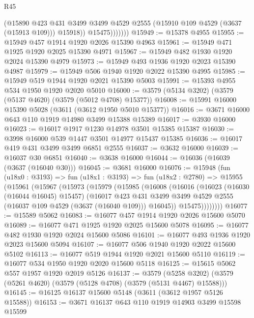 \begin{lexlean}{R45}
\begin{coremodule}
                    (@15890
                      @423
                      @431
                      @3499
                      @3499
                      @4529
                      @2555
                      (@15910 @109 @4529 (@3637 (@15913 @109)))
                      @15918))
                  @15475)))))))
@15949 := @15378 @4955
@15955 := @15949 @457 @1914 @1920 @2026 @15390 @4963
@15961 := @15949 @471 @1925 @1920 @2025 @15390 @4971
@15967 := @15949 @482 @1930 @1920 @2024 @15390 @4979
@15973 := @15949 @493 @1936 @1920 @2023 @15390 @4987
@15979 := @15949 @506 @1940 @1920 @2022 @15390 @4995
@15985 := @15949 @519 @1944 @1920 @2021 @15390 @5003
@15991 := @15393 @4955 @534 @1950 @1920 @2020 @5010
@16000 := @3579 (@5134 @3202) (@3579 (@5137 @4620) (@3579 (@5012 @4708) @15377))
@16008 := @15991 @16000 @15390 @5028 (@3611 (@3612 @1950 @5010 @15377))
@16016 := @3671 @16000 @643 @110 @1919 @14980 @3499 @15388 @15389
@16017 := @3930 @16000
@16023 := @16017 @1917 @1230 @14978 @3501 @15385 @15387
@16030 := @3998 @16000 @539 @1447 @3501 @14977 @15437 @15385
@16036 := @16017 @419 @431 @3499 @3499 @6851 @2555
@16037 := @3632 @16000
@16039 := @16037 @30 @6851
@16040 := @3638 @16000
@16044 := @16036 (@16039 (@3637 (@16040 @30)))
@16045 := @3681 @16000
@16076 := @15948
    (fun (u18x0 : @3193) =>
    fun (u18x1 : @3193) =>
    fun (u18x2 : @2780) =>
    @15955
      (@15961
        (@15967
          (@15973
            (@15979
              (@15985
                (@16008
                  (@16016
                    (@16023
                      (@16030 (@16044 @16045) @15457)
                      (@16017
                        @423
                        @431
                        @3499
                        @3499
                        @4529
                        @2555
                        (@16037 @109 @4529 (@3637 (@16040 @109)))
                        @16045))
                    @15475))))))))
@16077 := @15589 @5062
@16083 := @16077 @457 @1914 @1920 @2026 @15600 @5070
@16089 := @16077 @471 @1925 @1920 @2025 @15600 @5078
@16095 := @16077 @482 @1930 @1920 @2024 @15600 @5086
@16101 := @16077 @493 @1936 @1920 @2023 @15600 @5094
@16107 := @16077 @506 @1940 @1920 @2022 @15600 @5102
@16113 := @16077 @519 @1944 @1920 @2021 @15600 @5110
@16119 := @16077 @534 @1950 @1920 @2020 @15600 @5118
@16125 := @15615 @5062 @557 @1957 @1920 @2019 @5126
@16137 := @3579
    (@5258 @3202)
    (@3579 (@5261 @4620) (@3579 (@5128 @4708) (@3579 (@5131 @4467) @15588)))
@16145 := @16125 @16137 @15600 @5148 (@3611 (@3612 @1957 @5126 @15588))
@16153 := @3671 @16137 @643 @110 @1919 @14903 @3499 @15598 @15599

\end{coremodule}
\end{lexlean}
